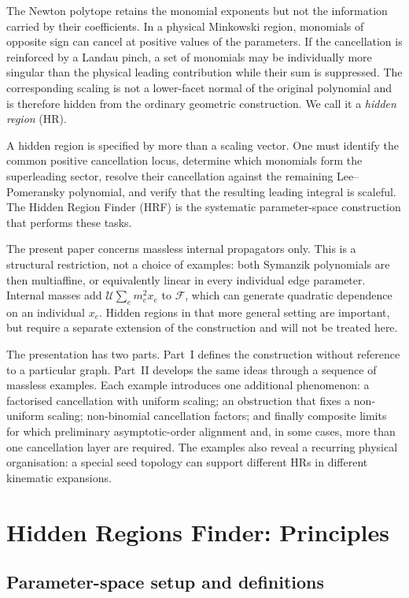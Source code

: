 \documentclass[a4paper,11pt]{article}
\begin{document}
The Newton polytope retains the monomial exponents but not the information
carried by their coefficients.  In a physical Minkowski region, monomials of
opposite sign can cancel at positive values of the parameters.  If the
cancellation is reinforced by a Landau pinch, a set of monomials may be
individually more singular than the physical leading contribution while
their sum is suppressed.  The corresponding scaling is not a lower-facet
normal of the original polynomial and is therefore hidden from the ordinary
geometric construction.  We call it a \emph{hidden region} (HR).

A hidden region is specified by more than a scaling vector.  One must
identify the common positive cancellation locus, determine which monomials
form the superleading sector, resolve their cancellation against the
remaining Lee--Pomeransky polynomial, and verify that the resulting leading
integral is scaleful.  The Hidden Region Finder (HRF) is the systematic
parameter-space construction that performs these tasks.

The present paper concerns massless internal propagators only.  This is a
structural restriction, not a choice of examples: both Symanzik polynomials
are then multiaffine, or equivalently linear in every individual edge
parameter.  Internal masses add
\(\mathcal U\sum_e m_e^2x_e\) to \(\mathcal F\), which can generate
quadratic dependence on an individual \(x_e\).  Hidden regions in that more
general setting are important, but require a separate extension of the
construction and will not be treated here.

The presentation has two parts.  Part~I defines the construction without
reference to a particular graph.  Part~II develops the same ideas through a
sequence of massless examples.  Each example introduces one additional
phenomenon: a factorised cancellation with uniform scaling; an obstruction
that fixes a non-uniform scaling; non-binomial cancellation factors; and
finally composite limits for which preliminary asymptotic-order alignment
and, in some cases, more than one cancellation layer are required.  The
examples also reveal a recurring physical organisation: a special seed
topology can support different HRs in different kinematic expansions.

\section{Hidden Regions Finder: Principles}
\label{sec:principles}

\subsection{Parameter-space setup and definitions}
\label{sec:notation}
\end{document}

